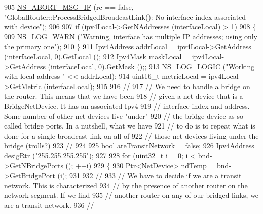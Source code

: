 \begin{DoxyCode}
905   \hyperlink{group__fatal_ga6653324225bc139e46deea177614ceee}{NS\_ABORT\_MSG\_IF} (rc == \textcolor{keyword}{false}, \textcolor{stringliteral}{"GlobalRouter::ProcessBridgedBroadcastLink(): No interface
       index associated with device"});
906 
907   \textcolor{keywordflow}{if} (ipv4Local->GetNAddresses (interfaceLocal) > 1)
908     \{
909       \hyperlink{group__logging_gade7208b4009cdf0e25783cd26766f559}{NS\_LOG\_WARN} (\textcolor{stringliteral}{"Warning, interface has multiple IP addresses; using only the primary one"});
910     \}
911   Ipv4Address addrLocal = ipv4Local->GetAddress (interfaceLocal, 0).GetLocal ();
912   Ipv4Mask maskLocal = ipv4Local->GetAddress (interfaceLocal, 0).GetMask ();;
913   \hyperlink{group__logging_ga88acd260151caf2db9c0fc84997f45ce}{NS\_LOG\_LOGIC} (\textcolor{stringliteral}{"Working with local address "} << addrLocal);
914   uint16\_t metricLocal = ipv4Local->GetMetric (interfaceLocal);
915 
916   \textcolor{comment}{//}
917   \textcolor{comment}{// We need to handle a bridge on the router.  This means that we have been }
918   \textcolor{comment}{// given a net device that is a BridgeNetDevice.  It has an associated Ipv4}
919   \textcolor{comment}{// interface index and address.  Some number of other net devices live "under"}
920   \textcolor{comment}{// the bridge device as so-called bridge ports.  In a nutshell, what we have}
921   \textcolor{comment}{// to do is to repeat what is done for a single broadcast link on all of }
922   \textcolor{comment}{// those net devices living under the bridge (trolls?)}
923   \textcolor{comment}{//}
924 
925   \textcolor{keywordtype}{bool} areTransitNetwork = \textcolor{keyword}{false};
926   Ipv4Address desigRtr (\textcolor{stringliteral}{"255.255.255.255"});
927 
928   \textcolor{keywordflow}{for} (uint32\_t \hyperlink{bernuolliDistribution_8m_a6f6ccfcf58b31cb6412107d9d5281426}{i} = 0; \hyperlink{bernuolliDistribution_8m_a6f6ccfcf58b31cb6412107d9d5281426}{i} < bnd->GetNBridgePorts (); ++\hyperlink{bernuolliDistribution_8m_a6f6ccfcf58b31cb6412107d9d5281426}{i})
929     \{
930       Ptr<NetDevice> ndTemp = bnd->GetBridgePort (\hyperlink{bernuolliDistribution_8m_a6f6ccfcf58b31cb6412107d9d5281426}{i});
931 
932       \textcolor{comment}{//}
933       \textcolor{comment}{// We have to decide if we are a transit network.  This is characterized}
934       \textcolor{comment}{// by the presence of another router on the network segment.  If we find}
935       \textcolor{comment}{// another router on any of our bridged links, we are a transit network.}
936       \textcolor{comment}{//}

\end{DoxyCode}
